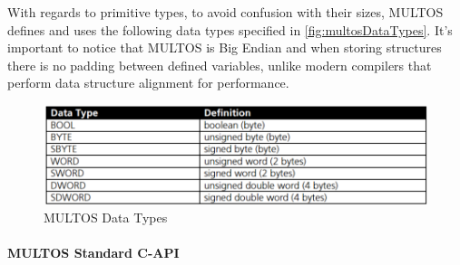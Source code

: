 With regards to primitive types, to avoid confusion with their sizes, MULTOS defines and uses the following data types specified in \autoref{fig:multosDataTypes}. It's important to notice that MULTOS is Big Endian
and when storing structures there is no padding between defined variables, unlike modern compilers that perform data structure alignment \citep{dataStructAlign} for performance.

\begin{figure}[bth]
	\begin{center}
		\includegraphics[width=\linewidth]{gfx/multosDataTypes}
	\end{center}
	\caption{MULTOS Data Types}
	\label{fig:multosDataTypes}
\end{figure}


\paragraph{MULTOS Standard C-API}

